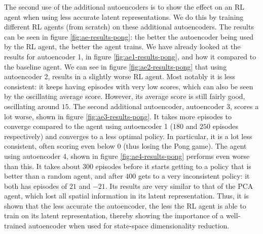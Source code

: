 The second use of the additional autoencoders is to show the effect on an RL agent when using less accurate latent representations. We do this by training different RL agents (from scratch) on these additional autoencoders. The results can be seen in figure \ref{fig:ae-results-pong}: the better the autoencoder being used by the RL agent, the better the agent trains. We have already looked at the results for autoencoder 1, in figure \ref{fig:ae1-results-pong}, and how it compared to the baseline agent. We can see in figure \ref{fig:ae2-results-pong} that using autoencoder 2, results in a slightly worse RL agent. Most notably it is less consistent: it keeps having episodes with very low scores, which can also be seen by the oscillating average score. However, its average score is still fairly good, oscillating around $15$. The second additional autoencoder, autoencoder 3, scores a lot worse, shown in figure \ref{fig:ae3-results-pong}. It takes more episodes to converge compared to the agent using autoencoder 1 ($180$ and $250$ episodes respectively) and converges to a less optimal policy. In particular, it is a lot less consistent, often scoring even below $0$ (thus losing the Pong game). The agent using autoencoder 4, shown in figure \ref{fig:ae4-results-pong} performs even worse than this. It takes about $300$ episodes before it starts getting to a policy that is better than a random agent, and after $400$ gets to a very inconsistent policy: it both has episodes of $21$ and $-21$. Its results are very similar to that of the PCA agent, which lost all spatial information in its latent representation. Thus, it is shown that the less accurate the autoencoder, the less the RL agent is able to train on its latent representation, thereby showing the importance of a well-trained autoencoder when used for state-space dimensionality reduction.


